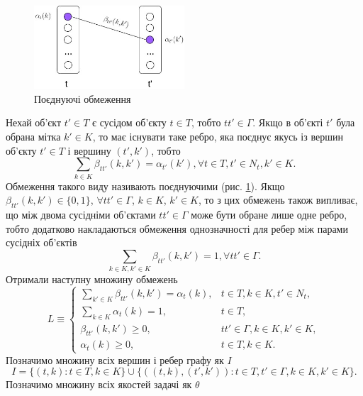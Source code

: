 \begin{figure}[h]
  \centering
  \includegraphics[width=0.5\textwidth]{images/coupling_constr.jpg}
  \caption{Поєднуючі обмеження}
  \label{fig:coupling_constr}
\end{figure}

Нехай об'єкт $t'\in T$ є сусідом об'єкту $t\in T$, тобто $tt'\in \Gamma$. Якщо
в об'єкті $t'$ була обрана мітка $k'\in K$, то має існувати таке ребро, яка поєднує
якусь із вершин об'єкту $t' \in T$ і вершину $(t',k')$, тобто
\begin{equation*}
  \sum\limits_{k\in K}\beta_{tt'}(k,k')=\alpha_{t'}(k'), \forall t\in T, t'\in N_t, k'\in K.
\end{equation*}
Обмеження такого виду називають поєднуючими (рис. \ref{fig:coupling_constr}).
Якщо $\beta_{tt'}(k,k')\in \{0,1\}$, $\forall tt'\in\Gamma$, $k\in K$, $k'\in K$,
то з цих обмежень також випливає, що між двома сусідніми об'єктами $tt'\in\Gamma$ може бути
обране лише одне ребро, тобто додатково накладаються обмеження однозначності
для ребер між парами сусідніх об'єктів
\begin{equation*}
  \sum\limits_{k \in K, k'\in K} \beta_{tt'}(k,k')=1, \forall tt'\in\Gamma.
\end{equation*}
Отримали наступну множину обмежень
\begin{equation*}
  L \equiv
  \begin{cases}
    \sum\limits_{k' \in K} \beta_{tt'}(k,k') = \alpha_t(k), & t\in T, k\in K, t'\in N_t,\\
    \sum\limits_{k \in K} \alpha_t(k)=1, & t\in T,\\
    \beta_{tt'}(k,k')\geq 0, & tt'\in \Gamma, k\in K, k'\in K,\\
    \alpha_t(k)\geq 0, & t\in T, k\in K.
  \end{cases}
\end{equation*}
Позначимо множину всіх вершин і ребер графу як $I$
\begin{equation*}
  I = \{(t,k):t\in T, k\in K\}\cup\{((t,k),(t',k')):t\in T, t'\in\Gamma, k\in K, k'\in K\}.
\end{equation*}
Позначимо множину всіх якостей задачі як $\theta$
